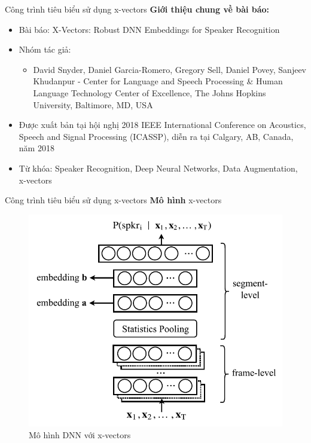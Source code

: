 \documentclass[notheorems, aspectratio=54]{beamer}
\begin{document}
\begin{frame}{Công trình tiêu biểu sử dụng x-vectors}
\textbf{Giới thiệu chung về bài báo:}
\begin{itemize}
	\item Bài báo: X-Vectors: Robust DNN Embeddings for Speaker Recognition
	\item Nhóm tác giả: 
	\begin{itemize}
		\item David Snyder, Daniel Garcia-Romero, Gregory Sell, Daniel Povey, Sanjeev Khudanpur - Center for Language and Speech Processing \& Human Language Technology Center of Excellence, The Johns Hopkins University, Baltimore, MD, USA
	\end{itemize}
	\item Được xuất bản tại hội nghị 2018 IEEE International Conference on Acoustics, Speech and Signal Processing (ICASSP), diễn ra tại Calgary, AB, Canada, năm 2018
	\item Từ khóa: Speaker Recognition, Deep Neural Networks, Data Augmentation, x-vectors
\end{itemize}
\end{frame}
\begin{frame}{Công trình tiêu biểu sử dụng x-vectors}
	\textbf{Mô hình} x-vectors
	\begin{figure}[H]
		\includegraphics[width=0.65\linewidth]{images/x-vector.jpg}
		\caption{Mô hình DNN với x-vectors}
		\label{fig:writing-thesis}
	\end{figure}
\end{frame}
\end{document}
